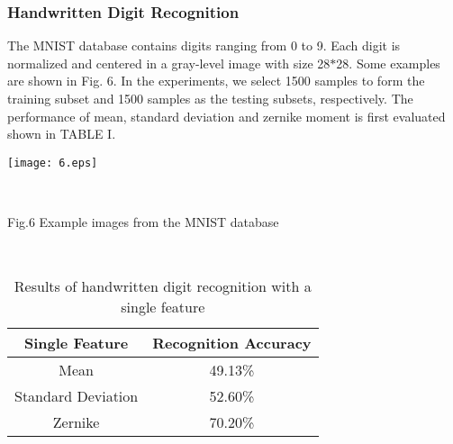 \documentclass[journal]{IEEEtran}
\begin{document}
\subsubsection{Handwritten Digit Recognition}
The MNIST database contains digits ranging from 0 to 9. Each digit is normalized and centered in a gray-level image with size 28$*$28. Some examples are shown in Fig. 6. In the experiments, we select 1500 samples to form the training subset and 1500 samples as the testing subsets, respectively. The performance of mean, standard deviation and zernike moment is first evaluated shown in TABLE I.\\
\centerline {\texttt{[image: 6.eps]}}\\  \centerline {Fig.6  Example images from the MNIST database}\\
\vspace*{-10pt}
\begin{table}[h]
\normalsize
\renewcommand{\arraystretch}{1.0}
\caption{\normalsize{Results of handwritten digit recognition with a single feature}}
\setlength{\abovecaptionskip}{0pt}
\setlength{\belowcaptionskip}{10pt}
\centering
\tabcolsep 0.073in
\begin{tabular}{cc}
\hline
Single Feature & Recognition Accuracy\\
\hline
Mean &49.13\%\\
Standard Deviation &52.60\%\\
Zernike &70.20\%\\
\hline
\end{tabular}
\end{table}\\
\end{document}
